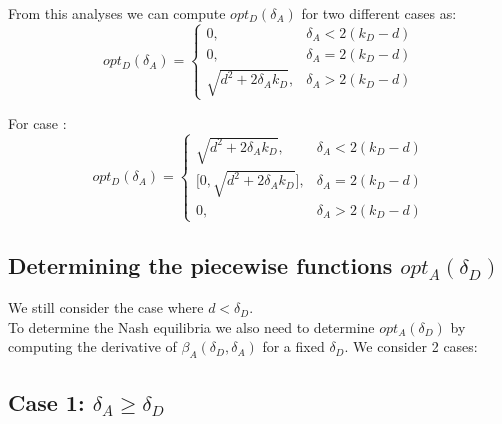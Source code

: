 From this analyses we can compute $opt_{D}(\delta_{A})$ for two different cases as:
 \begin{displaymath}
  opt_{D}(\delta_{A}) = \left\{
     \begin{array}{lr}
       0, & \delta_{A} < 2(k_{D} - d)\\
       0, & \delta_{A} = 2(k_{D} - d) \\
       \sqrt{d^{2} + 2\delta_{A}k_{D}}, & \delta_{A} > 2(k_{D} - d)
     \end{array}
   \right.
\end{displaymath}

For case :
 \begin{displaymath}
  opt_{D}(\delta_{A}) = \left\{
     \begin{array}{lr}
       \sqrt{d^{2} + 2\delta_{A}k_{D}}, & \delta_{A} < 2(k_{D} - d)\\
       \big[0,\sqrt{d^{2} + 2\delta_{A}k_{D}}\big], & \delta_{A} = 2(k_{D} - d) \\
       0, & \delta_{A} > 2(k_{D} - d)
     \end{array}
   \right.
\end{displaymath}


%
%
\subsection{Determining the piecewise functions $opt_{A}(\delta_{D})$}
We still consider the case where $d < \delta_{D}$. \\
To determine the Nash equilibria we also need to determine $opt_{A}(\delta_{D})$ by computing the derivative of $\beta_{A}(\delta_{D},\delta_{A})$ for a fixed $\delta_{D}$. We consider 2 cases: \\

\subsection*{Case 1: $\delta_{A} \geq \delta_{D}$}

